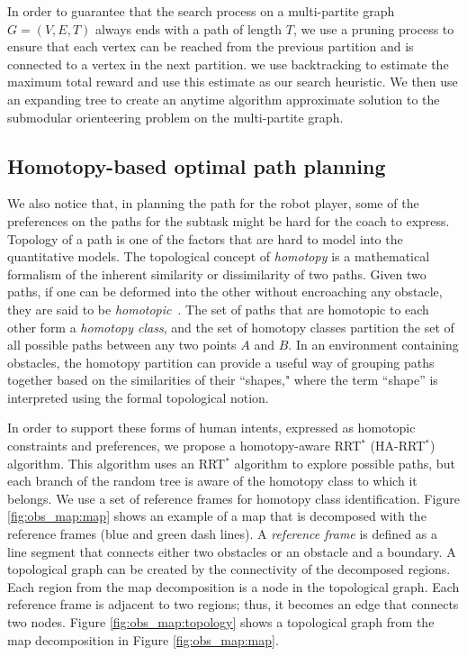 \documentclass[phd]{byuprop}
\begin{document}
In order to guarantee that the search process on a multi-partite graph $ G = (V, E, T) $ always ends with a path of length $ T $, we use a pruning process to ensure that each vertex can be reached from the previous partition and is connected to a vertex in the next partition.
we use backtracking to estimate the maximum total reward and use this estimate as our search heuristic.
We then use an expanding tree to create an anytime algorithm approximate solution to the submodular orienteering problem on the multi-partite graph.

\subsection{Homotopy-based optimal path planning}

We also notice that, in planning the path for the robot player, some of the preferences on the paths for the subtask might be hard for the coach to express.
Topology of a path is one of the factors that are hard to model into the quantitative models.
The topological concept of \emph{homotopy} is a mathematical formalism of the inherent similarity or dissimilarity of two paths.
Given two paths, if one can be deformed into the other without encroaching any obstacle, they are said to be \emph{homotopic}~\cite{Hernandez2015}.
The set of paths that are homotopic to each other form a \emph{homotopy class}, and the  set of homotopy classes partition the set of all possible paths between any two points $A$ and $B$.
In an environment containing obstacles, the homotopy partition can provide a useful way of grouping paths together based on the similarities of their ``shapes," where the term ``shape'' is interpreted using the formal topological notion.

In order to support these forms of human intents, expressed as homotopic constraints and preferences, we propose a homotopy-aware RRT$^{*}$ (HA-RRT$^{*}$) algorithm. 
This algorithm uses an RRT$^*$ algorithm to explore possible paths, but each branch of the random tree is aware of the homotopy class to which it belongs. 
We use a set of reference frames for homotopy class identification.
Figure \ref{fig:obs_map:map} shows an example of a map that is decomposed with the reference frames (blue and green dash lines).
A \emph{reference frame} is defined as a line segment that connects either two obstacles or an obstacle and a boundary.
A topological graph can be created by the connectivity of the decomposed regions.
Each region from the map decomposition is a node in the topological graph.
Each reference frame is adjacent to two regions; thus, it becomes an edge that connects two nodes.
Figure \ref{fig:obs_map:topology} shows a topological graph from the map decomposition in Figure \ref{fig:obs_map:map}.
\end{document}
